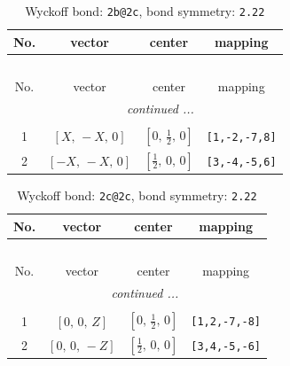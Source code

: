 \documentclass[fleqn,8pt]{jsarticle}
\begin{document}
\renewcommand{\arraystretch}{1.2}
\begin{longtable}{cccc}
\caption{Wyckoff bond: {\tt 2b@2c}, bond symmetry: {\tt 2.22}}
 \\
 \hline \hline
No. & vector & center & mapping \\ \hline \endfirsthead

\multicolumn{3}{l}{\tablename\ \thetable{}} \\
 \hline \hline
No. & vector & center & mapping \\ \hline \endhead

 \hline \hline
\multicolumn{3}{r}{\footnotesize\it continued ...} \\ \endfoot

 \hline \hline
\multicolumn{3}{r}{} \\ \endlastfoot

1 & $\left[ X,\, - X,\, 0 \right]$ & $\left[ 0,\, \frac{1}{2},\, 0 \right]$ & {\tt [1,-2,-7,8]} \\ \hline
2 & $\left[ - X,\, - X,\, 0 \right]$ & $\left[ \frac{1}{2},\, 0,\, 0 \right]$ & {\tt [3,-4,-5,6]} \\
\end{longtable}
\renewcommand{\arraystretch}{1.2}
\begin{longtable}{cccc}
\caption{Wyckoff bond: {\tt 2c@2c}, bond symmetry: {\tt 2.22}}
 \\
 \hline \hline
No. & vector & center & mapping \\ \hline \endfirsthead

\multicolumn{3}{l}{\tablename\ \thetable{}} \\
 \hline \hline
No. & vector & center & mapping \\ \hline \endhead

 \hline \hline
\multicolumn{3}{r}{\footnotesize\it continued ...} \\ \endfoot

 \hline \hline
\multicolumn{3}{r}{} \\ \endlastfoot

1 & $\left[ 0,\, 0,\, Z \right]$ & $\left[ 0,\, \frac{1}{2},\, 0 \right]$ & {\tt [1,2,-7,-8]} \\ \hline
2 & $\left[ 0,\, 0,\, - Z \right]$ & $\left[ \frac{1}{2},\, 0,\, 0 \right]$ & {\tt [3,4,-5,-6]} \\
\end{longtable}
\renewcommand{\arraystretch}{1.2}
\end{document}
